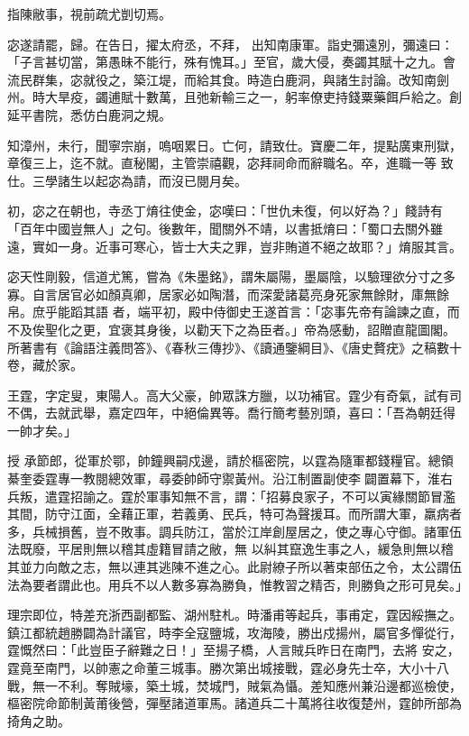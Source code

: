 \begin{pinyinscope}
 指陳敝事，視前疏尤剴切焉。



 宓遂請罷，歸。在告日，擢太府丞，不拜，
 出知南康軍。詣史彌遠別，彌遠曰：「子言甚切當，第愚昧不能行，殊有愧耳。」至官，歲大侵，奏蠲其賦十之九。會流民群集，宓就役之，築江堤，而給其食。時造白鹿洞，與諸生討論。改知南劍州。時大旱疫，蠲逋賦十數萬，且弛新輸三之一，躬率僚吏持錢粟藥餌戶給之。創延平書院，悉仿白鹿洞之規。



 知漳州，未行，聞寧宗崩，嗚咽累日。亡何，請致仕。寶慶二年，提點廣東刑獄，章復三上，迄不就。直秘閣，主管崇禧觀，宓拜祠命而辭職名。卒，進職一等
 致仕。三學諸生以起宓為請，而沒已閱月矣。



 初，宓之在朝也，寺丞丁焴往使金，宓嘆曰：「世仇未復，何以好為？」餞詩有「百年中國豈無人」之句。後數年，聞關外不靖，以書抵焴曰：「蜀口去關外雖遠，實如一身。近事可寒心，皆士大夫之罪，豈非賄道不絕之故耶？」焴服其言。



 宓天性剛毅，信道尤篤，嘗為《朱墨銘》，謂朱屬陽，墨屬陰，以驗理欲分寸之多寡。自言居官必如顏真卿，居家必如陶潛，而深愛諸葛亮身死家無餘財，庫無餘帛。庶乎能蹈其語
 者，端平初，殿中侍御史王遂首言：「宓事先帝有論諫之直，而不及俟聖化之更，宜褒其身後，以勸天下之為臣者。」帝為感動，詔贈直龍圖閣。所著書有《論語注義問答》、《春秋三傳抄》、《讀通鑒綱目》、《唐史贅疣》之稿數十卷，藏於家。



 王霆，字定叟，東陽人。高大父豪，帥眾誅方臘，以功補官。霆少有奇氣，試有司不偶，去就武舉，嘉定四年，中絕倫異等。喬行簡考藝別頭，喜曰：「吾為朝廷得一帥才矣。」



 授
 承節郎，從軍於鄂，帥鐘興嗣戍邊，請於樞密院，以霆為隨軍都錢糧官。總領綦奎委霆專一教閱總效軍，尋委帥師守禦黃州。沿江制置副使李𡌴闢置幕下，淮右兵叛，遣霆招諭之。霆於軍事知無不言，謂：「招募良家子，不可以寅緣關節冒濫其間，防守江面，全藉正軍，若義勇、民兵，特可為聲援耳。而所謂大軍，羸病者多，兵械損舊，豈不敗事。調兵防江，當於江岸創屋居之，使之專心守御。諸軍伍法既廢，平居則無以稽其虛籍冒請之敝，無
 以糾其竄逸生事之人，緩急則無以稽其並力向敵之志，無以連其逃陳不進之心。此尉繚子所以著束部伍之令，太公謂伍法為要者謂此也。用兵不以人數多寡為勝負，惟教習之精否，則勝負之形可見矣。」



 理宗即位，特差充浙西副都監、湖州駐札。時潘甫等起兵，事甫定，霆因綏撫之。鎮江都統趙勝闢為計議官，時李全寇鹽城，攻海陵，勝出戍揚州，屬官多憚從行，霆慨然曰：「此豈臣子辭難之日！」至揚子橋，人言賊兵昨日在南門，去將
 安之，霆竟至南門，以帥憲之命董三城事。勝次第出城接戰，霆必身先士卒，大小十八戰，無一不利。奪賊壕，築土城，焚城門，賊氣為懾。差知應州兼沿邊都巡檢使，樞密院命節制黃莆後營，彈壓諸道軍馬。諸道兵二十萬將往收復楚州，霆帥所部為掎角之助。




\end{pinyinscope}
